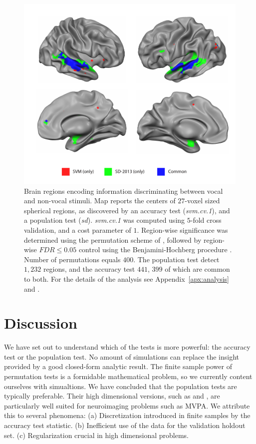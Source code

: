 \documentclass[12pt,a4paper]{article}
\theoremstyle{definition}
\begin{document}
\begin{figure}[th]
\centering
\includegraphics[width=0.7\linewidth]{"art/svm_vs_SD"}
\caption{\footnotesize
Brain regions encoding information discriminating between vocal and non-vocal stimuli.
Map reports the centers of $27$-voxel sized spherical regions, as discovered by an accuracy test (\emph{svm.cv.1}), and a population test (\emph{sd}). 
\emph{svm.cv.1} was computed using $5$-fold cross validation, and a cost parameter of $1$. 
Region-wise significance was determined using the permutation scheme of \cite{stelzer_statistical_2013}, followed by region-wise $FDR \leq 0.05$ control using the Benjamini-Hochberg procedure \citep{benjamini_controlling_1995}.
Number of permutations equals $400$.
The population test detect $1,232$ regions, and the accuracy test $441$, $399$ of which are common to both.
For the details of the analysis see Appendix~\ref{apx:analysis} and \cite{gilron_quantifying_2016}.  
  }
\label{fig:read_data}
\end{figure}








\section{Discussion}
\label{sec:discussion}

We have set out to understand which of the tests is more powerful: the accuracy test or the population test. 
No amount of simulations can replace the insight provided by a good closed-form analytic result. 
The finite sample power of permutation tests is a formidable mathematical problem, so we currently content ourselves with simualtions. 
We have concluded that the population tests are typically preferable. 
Their high dimensional versions, such as \cite{srivastava_multivariate_2007} and \cite{schafer_shrinkage_2005},  are particularly well suited for neuroimaging problems such as MVPA.
We attribute this to several phenomena: 
(a) Discretization introduced in finite samples by the accuracy test statistic. 
(b) Inefficient use of the data for the validation holdout set. 
(c) Regularization crucial in high dimensional problems.
\end{document}
